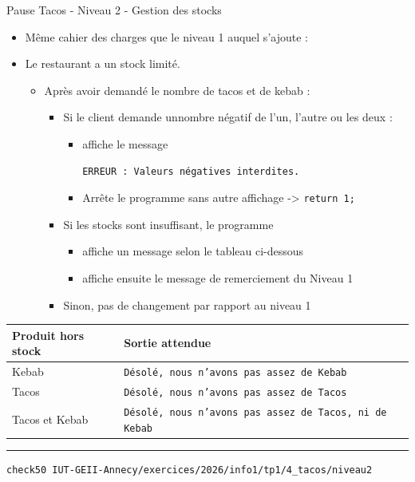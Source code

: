 \begin{UPSTIcahierDesCharges}{Pause Tacos - Niveau 2 - Gestion des stocks}
	\begin{itemize}
		\item[$\Box$] Même cahier des charges que le niveau 1 auquel s'ajoute :
		\item[$\Box$] Le restaurant a un stock limité.
		      \begin{itemize}
			      \item[$\Box$] Après avoir demandé le nombre de tacos et de kebab :
			            \begin{itemize}
				            \item[$\Box$] Si le client demande unnombre négatif de l'un, l'autre ou les deux :
				                  \begin{itemize}
					                  \item[$\Box$] affiche le message
					                        \begin{lstlisting}[language=bash,style=console]
			ERREUR : Valeurs négatives interdites.
\end{lstlisting}
					                  \item[$\Box$] Arrête le programme sans autre affichage -> \texttt{return 1;}
				                  \end{itemize}
				            \item[$\Box$] Si les stocks sont insuffisant, le programme
				                  \begin{itemize}
					                  \item[$\Box$] affiche un message selon le tableau ci-dessous
					                  \item[$\Box$] affiche ensuite le message de remerciement du Niveau 1
				                  \end{itemize}
				            \item[$\Box$] Sinon, pas de changement par rapport au niveau 1
			            \end{itemize}
		      \end{itemize}
	\end{itemize}

	\begin{center}
		\begin{tabular}{|l|l|}
			\hline
			Produit hors stock & Sortie attendue                                               \\
			\hline
			Kebab              & \texttt{Désolé, nous n'avons pas assez de Kebab}              \\
			Tacos              & \texttt{Désolé, nous n'avons pas assez de Tacos}              \\
			Tacos et Kebab     & \texttt{Désolé, nous n'avons pas assez de Tacos, ni de Kebab} \\
			\hline
		\end{tabular}
	\end{center}
	\hrule
	\begin{lstlisting}[language=bash,style=console]
check50 IUT-GEII-Annecy/exercices/2026/info1/tp1/4_tacos/niveau2
\end{lstlisting}
\end{UPSTIcahierDesCharges}

